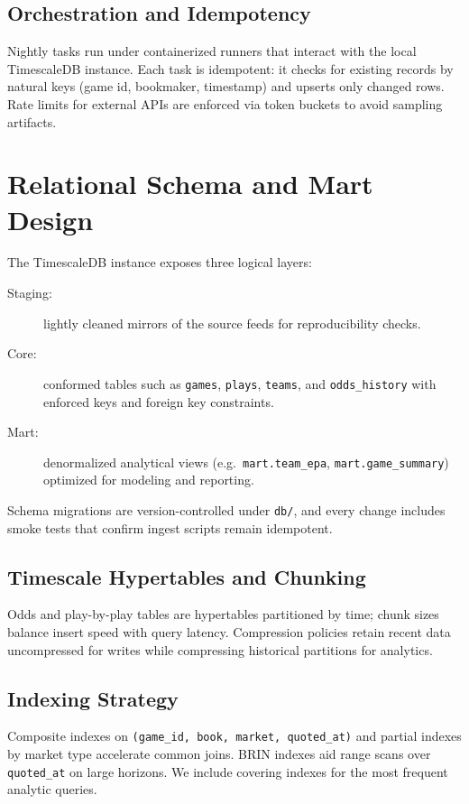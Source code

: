 \subsection{Orchestration and Idempotency}
Nightly tasks run under containerized runners that interact with the local TimescaleDB instance. Each task is idempotent: it checks for existing records by natural keys (game id, bookmaker, timestamp) and upserts only changed rows. Rate limits for external APIs are enforced via token buckets to avoid sampling artifacts.

\section{Relational Schema and Mart Design}\label{sec:schema-mart}
The TimescaleDB instance exposes three logical layers:
\begin{description}
  \item[Staging:] lightly cleaned mirrors of the source feeds for reproducibility checks.
  \item[Core:] conformed tables such as \texttt{games}, \texttt{plays}, \texttt{teams}, and \texttt{odds\_history} with enforced keys and foreign key constraints.
  \item[Mart:] denormalized analytical views (e.g.\ \texttt{mart.team\_epa}, \texttt{mart.game\_summary})\\ optimized for modeling and reporting.
\end{description}
Schema migrations are version-controlled under \texttt{db/}, and every change includes smoke tests that confirm ingest scripts remain idempotent.

\subsection{Timescale Hypertables and Chunking}
Odds and play-by-play tables are hypertables partitioned by time; chunk sizes balance insert speed with query latency. Compression policies retain recent data uncompressed for writes while compressing historical partitions for analytics.

\subsection{Indexing Strategy}
Composite indexes on \texttt{(game\_id, book, market, quoted\_at)} and partial indexes by market type accelerate common joins. BRIN indexes aid range scans over \texttt{quoted\_at} on large horizons. We include covering indexes for the most frequent analytic queries.

